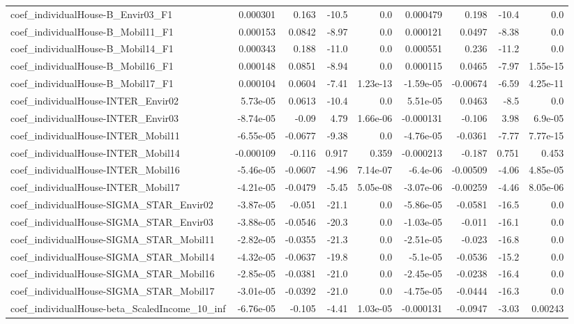 \begin{tabular}{lrrrrrrrr}
coef_individualHouse-B_Envir03_F1 & 0.000301 & 0.163 & -10.5 & 0.0 & 0.000479 & 0.198 & -10.4 & 0.0 \\
coef_individualHouse-B_Mobil11_F1 & 0.000153 & 0.0842 & -8.97 & 0.0 & 0.000121 & 0.0497 & -8.38 & 0.0 \\
coef_individualHouse-B_Mobil14_F1 & 0.000343 & 0.188 & -11.0 & 0.0 & 0.000551 & 0.236 & -11.2 & 0.0 \\
coef_individualHouse-B_Mobil16_F1 & 0.000148 & 0.0851 & -8.94 & 0.0 & 0.000115 & 0.0465 & -7.97 & 1.55e-15 \\
coef_individualHouse-B_Mobil17_F1 & 0.000104 & 0.0604 & -7.41 & 1.23e-13 & -1.59e-05 & -0.00674 & -6.59 & 4.25e-11 \\
coef_individualHouse-INTER_Envir02 & 5.73e-05 & 0.0613 & -10.4 & 0.0 & 5.51e-05 & 0.0463 & -8.5 & 0.0 \\
coef_individualHouse-INTER_Envir03 & -8.74e-05 & -0.09 & 4.79 & 1.66e-06 & -0.000131 & -0.106 & 3.98 & 6.9e-05 \\
coef_individualHouse-INTER_Mobil11 & -6.55e-05 & -0.0677 & -9.38 & 0.0 & -4.76e-05 & -0.0361 & -7.77 & 7.77e-15 \\
coef_individualHouse-INTER_Mobil14 & -0.000109 & -0.116 & 0.917 & 0.359 & -0.000213 & -0.187 & 0.751 & 0.453 \\
coef_individualHouse-INTER_Mobil16 & -5.46e-05 & -0.0607 & -4.96 & 7.14e-07 & -6.4e-06 & -0.00509 & -4.06 & 4.85e-05 \\
coef_individualHouse-INTER_Mobil17 & -4.21e-05 & -0.0479 & -5.45 & 5.05e-08 & -3.07e-06 & -0.00259 & -4.46 & 8.05e-06 \\
coef_individualHouse-SIGMA_STAR_Envir02 & -3.87e-05 & -0.051 & -21.1 & 0.0 & -5.86e-05 & -0.0581 & -16.5 & 0.0 \\
coef_individualHouse-SIGMA_STAR_Envir03 & -3.88e-05 & -0.0546 & -20.3 & 0.0 & -1.03e-05 & -0.011 & -16.1 & 0.0 \\
coef_individualHouse-SIGMA_STAR_Mobil11 & -2.82e-05 & -0.0355 & -21.3 & 0.0 & -2.51e-05 & -0.023 & -16.8 & 0.0 \\
coef_individualHouse-SIGMA_STAR_Mobil14 & -4.32e-05 & -0.0637 & -19.8 & 0.0 & -5.1e-05 & -0.0536 & -15.2 & 0.0 \\
coef_individualHouse-SIGMA_STAR_Mobil16 & -2.85e-05 & -0.0381 & -21.0 & 0.0 & -2.45e-05 & -0.0238 & -16.4 & 0.0 \\
coef_individualHouse-SIGMA_STAR_Mobil17 & -3.01e-05 & -0.0392 & -21.0 & 0.0 & -4.75e-05 & -0.0444 & -16.3 & 0.0 \\
coef_individualHouse-beta_ScaledIncome_10_inf & -6.76e-05 & -0.105 & -4.41 & 1.03e-05 & -0.000131 & -0.0947 & -3.03 & 0.00243 \\

\end{tabular}
